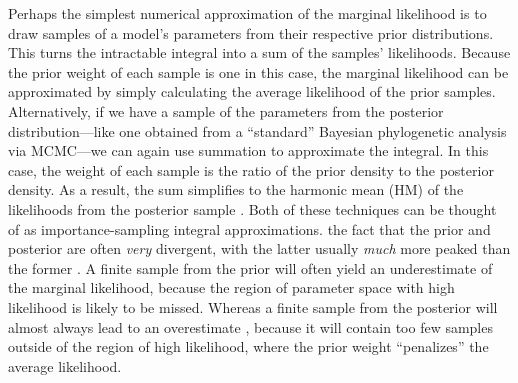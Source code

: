 Perhaps the simplest numerical approximation of the marginal likelihood is to
draw samples of a model's parameters from their respective prior distributions.
This turns the intractable integral into a sum of the samples' likelihoods.
Because the prior weight of each sample is one in this case, the marginal
likelihood can be approximated by simply calculating the average likelihood of
the prior samples.
Alternatively, if we have a sample of the parameters from the posterior
distribution---like one obtained from a ``standard'' Bayesian phylogenetic
analysis via MCMC---we can again use summation to approximate the integral.
In this case, the weight of each sample is the ratio of the prior density to
the posterior density.
As a result, the sum simplifies to the harmonic mean (HM) of the likelihoods
from the posterior sample \citep{Newton1994}.
Both of these techniques can be thought of as importance-sampling integral
approximations.
the fact that the prior and posterior are often \emph{very} divergent,
with the latter usually \emph{much} more peaked than the former .
A finite sample from the prior will often yield an underestimate of the
marginal likelihood, because the region of parameter space with high likelihood
is likely to be missed.
Whereas a finite sample from the posterior will almost always lead to an
overestimate \citep{Lartillot2006,Xie2011,Fan2011}, because it will contain too
few samples outside of the region of high likelihood, where the prior weight
``penalizes'' the average likelihood.

